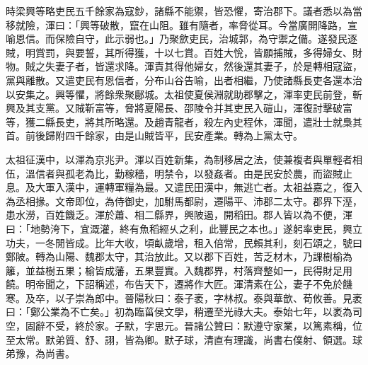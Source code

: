 \begin{pinyinscope}
時梁興等略吏民五千餘家為寇鈔，諸縣不能禦，皆恐懼，寄治郡下。議者悉以為當移就險，渾曰：「興等破散，竄在山阻。雖有隨者，率脅從耳。今當廣開降路，宣喻恩信。而保險自守，此示弱也。」乃聚歛吏民，治城郭，為守禦之備。遂發民逐賊，明賞罰，與要誓，其所得獲，十以七賞。百姓大恱，皆願捕賊，多得婦女、財物。賊之失妻子者，皆還求降。渾責其得他婦女，然後還其妻子，於是轉相寇盜，黨與離散。又遣吏民有恩信者，分布山谷告喻，出者相繼，乃使諸縣長吏各還本治以安集之。興等懼，將餘衆聚鄜城。太祖使夏侯淵就助郡擊之，渾率吏民前登，斬興及其支黨。又賊靳富等，脅將夏陽長、邵陵令并其吏民入磑山，渾復討擊破富等，獲二縣長吏，將其所略還。及趙青龍者，殺左內史程休，渾聞，遣壯士就梟其首。前後歸附四千餘家，由是山賊皆平，民安產業。轉為上黨太守。

太祖征漢中，以渾為京兆尹。渾以百姓新集，為制移居之法，使兼複者與單輕者相伍，溫信者與孤老為比，勤稼穡，明禁令，以發姦者。由是民安於農，而盜賊止息。及大軍入漢中，運轉軍糧為最。又遣民田漢中，無逃亡者。太祖益嘉之，復入為丞相掾。文帝即位，為侍御史，加駙馬都尉，遷陽平、沛郡二太守。郡界下溼，患水澇，百姓饑乏。渾於蕭、相二縣界，興陂遏，開稻田。郡人皆以為不便，渾曰：「地勢洿下，宜溉灌，終有魚稻經乆之利，此豐民之本也。」遂躬率吏民，興立功夫，一冬閒皆成。比年大收，頃畒歲增，租入倍常，民賴其利，刻石頌之，號曰鄭陂。轉為山陽、魏郡太守，其治放此。又以郡下百姓，苦乏材木，乃課樹榆為籬，並益樹五果；榆皆成藩，五果豐實。入魏郡界，村落齊整如一，民得財足用饒。明帝聞之，下詔稱述，布告天下，遷將作大匠。渾清素在公，妻子不免於饑寒。及卒，以子崇為郎中。晉陽秋曰：泰子袤，字林叔。泰與華歆、荀攸善。見袤曰：「鄭公業為不亡矣。」初為臨菑侯文學，稍遷至光祿大夫。泰始七年，以袤為司空，固辭不受，終於家。子默，字思元。晉諸公贊曰：默遵守家業，以篤素稱，位至太常。默弟質、舒、詡，皆為卿。默子球，清直有理識，尚書右僕射、領選。球弟豫，為尚書。


\end{pinyinscope}